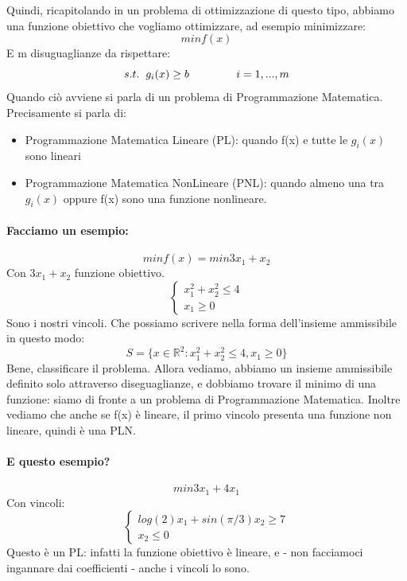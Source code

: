 Quindi, ricapitolando in un problema di ottimizzazione di questo tipo, abbiamo una funzione obiettivo che vogliamo ottimizzare, ad esempio minimizzare:
\begin{equation*}
    min f(x)
\end{equation*}
E m disuguaglianze da rispettare:
\begin{equation*}
    s.t. \hspace{0.2cm} g_i(x) \geq b \hspace{1.5cm} i = 1, ..., m
\end{equation*}
Quando ciò avviene si parla di un problema di Programmazione Matematica. Precisamente si parla di:
\begin{itemize}
    \item Programmazione Matematica Lineare (PL): quando f(x) e tutte le $g_i(x)$ sono lineari
    \item Programmazione Matematica NonLineare (PNL): quando almeno una tra $g_i(x)$ oppure f(x) sono una funzione nonlineare.
\end{itemize}


\paragraph{Facciamo un esempio:} 
\begin{equation*}
    min f(x) = min 3x_1 + x_2
\end{equation*}
Con $3x_1 + x_2$ funzione obiettivo.
\begin{equation*}
    \begin{cases}
        \text{$x_1^2 + x_2^2 \leq 4$}\\
        \text{$x_1 \geq 0$} 
    \end{cases}
\end{equation*}
Sono i nostri vincoli. Che possiamo scrivere nella forma dell'insieme ammissibile in questo modo:
\begin{equation*}
    S = \{x \in \mathbb{R}^2: x_1^2 + x_2^2 \leq 4, x_1 \geq 0\}
\end{equation*}
Bene, classificare il problema. Allora vediamo, abbiamo un insieme ammissibile definito solo attraverso diseguaglianze, e dobbiamo trovare il minimo di una funzione: siamo di fronte a un problema di Programmazione Matematica. Inoltre vediamo che anche se f(x) è lineare, il primo vincolo presenta una funzione non lineare, quindi è una PLN.

\paragraph{E questo esempio?} 
\begin{equation*}
    min 3x_1 + 4x_1 
\end{equation*}
Con vincoli:
\begin{equation*}
\begin{cases}
    \text{$log(2)x_1 + sin(\pi/3)x_2 \geq 7$}\\
    \text{$x_2 \leq 0$}
\end{cases}
\end{equation*}
Questo è un PL: infatti la funzione obiettivo è lineare, e - non facciamoci ingannare dai coefficienti - anche i vincoli lo sono.

